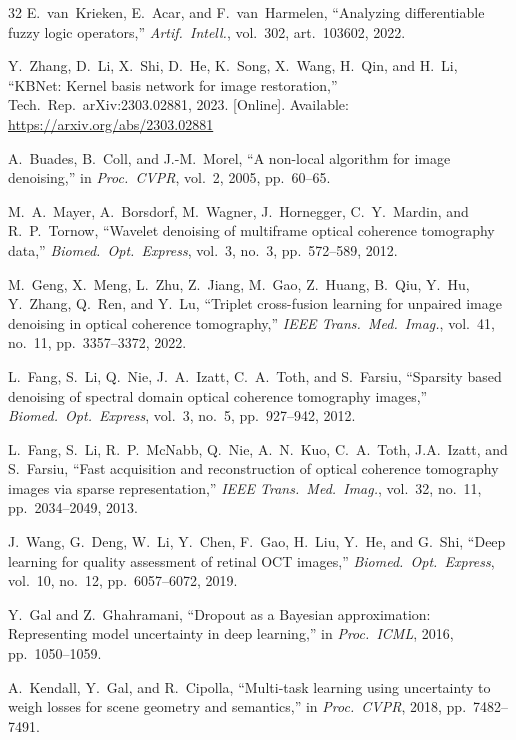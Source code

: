 \documentclass{ieeetj}
\begin{document}
{\begin{thebibliography}{32}
E.~van~Krieken, E.~Acar, and F.~van~Harmelen, ``Analyzing differentiable fuzzy logic operators,'' \emph{Artif.\ Intell.}, vol.~302, art.~103602, 2022.

Y.~Zhang, D.~Li, X.~Shi, D.~He, K.~Song, X.~Wang, H.~Qin, and H.~Li, ``KBNet: Kernel basis network for image restoration,'' Tech.\ Rep.\ arXiv:2303.02881, 2023. [Online]. Available: \url{https://arxiv.org/abs/2303.02881}

A.~Buades, B.~Coll, and J.-M.~Morel, ``A non-local algorithm for image denoising,'' in \emph{Proc.\ CVPR}, vol.~2, 2005, pp.~60--65.

M.~A.~Mayer, A.~Borsdorf, M.~Wagner, J.~Hornegger, C.~Y.~Mardin, and R.~P.~Tornow, ``Wavelet denoising of multiframe optical coherence tomography data,'' \emph{Biomed.\ Opt.\ Express}, vol.~3, no.~3, pp.~572--589, 2012.

M.~Geng, X.~Meng, L.~Zhu, Z.~Jiang, M.~Gao, Z.~Huang, B.~Qiu, Y.~Hu, Y.~Zhang, Q.~Ren, and Y.~Lu, ``Triplet cross-fusion learning for unpaired image denoising in optical coherence tomography,'' \emph{IEEE Trans.\ Med.\ Imag.}, vol.~41, no.~11, pp.~3357--3372, 2022.

L.~Fang, S.~Li, Q.~Nie, J.~A.~Izatt, C.~A.~Toth, and S.~Farsiu, ``Sparsity based denoising of spectral domain optical coherence tomography images,'' \emph{Biomed.\ Opt.\ Express}, vol.~3, no.~5, pp.~927--942, 2012.

L.~Fang, S.~Li, R.~P.~McNabb, Q.~Nie, A.~N.~Kuo, C.~A.~Toth, J.A.~Izatt, and S.~Farsiu, ``Fast acquisition and reconstruction of optical coherence tomography images via sparse representation,'' \emph{IEEE Trans.\ Med.\ Imag.}, vol.~32, no.~11, pp.~2034--2049, 2013.

J.~Wang, G.~Deng, W.~Li, Y.~Chen, F.~Gao, H.~Liu, Y.~He, and G.~Shi, ``Deep learning for quality assessment of retinal OCT images,'' \emph{Biomed.\ Opt.\ Express}, vol.~10, no.~12, pp.~6057--6072, 2019.

Y.~Gal and Z.~Ghahramani, ``Dropout as a Bayesian approximation: Representing model uncertainty in deep learning,'' in \emph{Proc.\ ICML}, 2016, pp.~1050--1059.

A.~Kendall, Y.~Gal, and R.~Cipolla, ``Multi-task learning using uncertainty to weigh losses for scene geometry and semantics,'' in \emph{Proc.\ CVPR}, 2018, pp.~7482--7491.


\end{thebibliography}}
\end{document}
